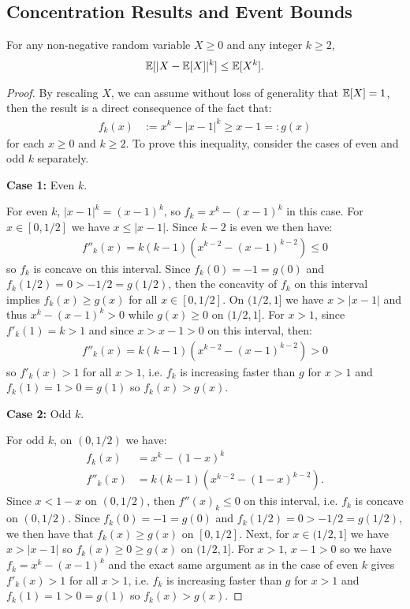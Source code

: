 \subsection{Concentration Results and Event Bounds}
\label{app:concentration}

\begin{lemma}\label{lemma:centered-moments}
For any non-negative random variable $X \geq 0$ and any integer $k \geq 2$, 
\begin{align*}
    \mathbb{E}[|X - \mathbb{E}[X]|^k] \leq \mathbb{E}[X^k].
\end{align*}
\end{lemma}

\begin{proof}
By rescaling $X$, we can assume without loss of generality that $\mathbb{E}[X] = 1$, then the result is a direct consequence of the fact that: 
\begin{align*}
    f_k(x) &:= x^k - |x-1|^k \geq x - 1 =: g(x)
\end{align*}
for each $x \geq 0$ and $k \geq 2$. To prove this inequality, consider the cases of even and odd $k$ separately.

\textbf{Case 1:} Even $k$.

For even $k$, $|x-1|^k = (x-1)^k$, so $f_k = x^k - (x-1)^k$ in this case. For $x \in [0,1/2]$ we have $x \leq |x - 1|$. Since $k-2$ is even we then have:
\begin{align*}
    f''_k(x) = k(k-1)(x^{k-2} - (x-1)^{k-2}) \leq 0
\end{align*}
so $f_k$ is concave on this interval. Since $f_k(0) = -1 = g(0)$ and $f_k(1/2) = 0 > -1/2 = g(1/2)$, then the concavity of $f_k$ on this interval implies $f_k(x) \geq g(x)$ for all $x \in [0,1/2]$. On $(1/2, 1]$ we have $x > |x - 1|$ and thus $x^k - (x-1)^k > 0$ while $g(x) \geq 0$ on $(1/2,1]$. For $x > 1$, since $f'_k(1) = k > 1$ and since $x > x-1 > 0$ on this interval, then:
\begin{align*}
    f''_k(x) = k(k-1)(x^{k-2} - (x-1)^{k-2}) > 0 
\end{align*}
so $f'_k(x) > 1$ for all $x > 1$, i.e. $f_k$ is increasing faster than $g$ for $x > 1$ and $f_k(1) = 1 >  0 = g(1)$ so $f_k(x) > g(x)$. 

\textbf{Case 2:} Odd $k$.

For odd $k$, on $(0,1/2)$ we have:
\begin{align*}
    f_k(x) &= x^k - (1-x)^k \\
    f''_k(x) &= k(k-1)(x^{k-2} - (1-x)^{k-2}).
\end{align*}
Since $x < 1 - x$ on $(0,1/2)$, then $f''(x)_k \leq 0$ on this interval, i.e. $f_k$ is concave on $(0,1/2)$. Since $f_k(0) = -1 = g(0)$ and $f_k(1/2) = 0 > -1/2 = g(1/2)$, we then have that $f_k(x) \geq g(x)$ on $[0,1/2]$. Next, for $x \in (1/2,1]$ we have $x > |x-1|$ so $f_k(x) \geq 0 \geq g(x)$ on $(1/2,1]$. For $x > 1$, $x - 1 > 0$ so we have $f_k = x^k - (x-1)^k$ and the exact same argument as in the case of even $k$ gives $f'_k(x) > 1$ for all $x > 1$, i.e. $f_k$ is increasing faster than $g$ for $x > 1$ and $f_k(1) = 1 >  0 = g(1)$ so $f_k(x) > g(x)$.  
\end{proof}

